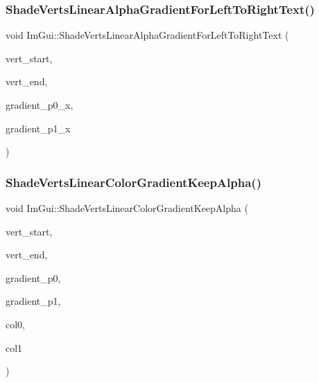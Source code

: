 \mbox{\label{namespace_im_gui_a73b4d230c8fffd2a07d799cd9d4e2a03}} 
\subsubsection{\texorpdfstring{Shade\+Verts\+Linear\+Alpha\+Gradient\+For\+Left\+To\+Right\+Text()}{ShadeVertsLinearAlphaGradientForLeftToRightText()}}
{\footnotesize\ttfamily void Im\+Gui\+::\+Shade\+Verts\+Linear\+Alpha\+Gradient\+For\+Left\+To\+Right\+Text (\begin{DoxyParamCaption}\item[{\mbox{\hyperlink{struct_im_draw_vert}{Im\+Draw\+Vert}} $\ast$}]{vert\+\_\+start,  }\item[{\mbox{\hyperlink{struct_im_draw_vert}{Im\+Draw\+Vert}} $\ast$}]{vert\+\_\+end,  }\item[{float}]{gradient\+\_\+p0\+\_\+x,  }\item[{float}]{gradient\+\_\+p1\+\_\+x }\end{DoxyParamCaption})}

\mbox{\label{namespace_im_gui_a7880876c5072e610be8f8e898d2a8866}} 
\subsubsection{\texorpdfstring{Shade\+Verts\+Linear\+Color\+Gradient\+Keep\+Alpha()}{ShadeVertsLinearColorGradientKeepAlpha()}}
{\footnotesize\ttfamily void Im\+Gui\+::\+Shade\+Verts\+Linear\+Color\+Gradient\+Keep\+Alpha (\begin{DoxyParamCaption}\item[{\mbox{\hyperlink{struct_im_draw_vert}{Im\+Draw\+Vert}} $\ast$}]{vert\+\_\+start,  }\item[{\mbox{\hyperlink{struct_im_draw_vert}{Im\+Draw\+Vert}} $\ast$}]{vert\+\_\+end,  }\item[{\mbox{\hyperlink{struct_im_vec2}{Im\+Vec2}}}]{gradient\+\_\+p0,  }\item[{\mbox{\hyperlink{struct_im_vec2}{Im\+Vec2}}}]{gradient\+\_\+p1,  }\item[{\mbox{\hyperlink{imgui_8h_a118cff4eeb8d00e7d07ce3d6460eed36}{Im\+U32}}}]{col0,  }\item[{\mbox{\hyperlink{imgui_8h_a118cff4eeb8d00e7d07ce3d6460eed36}{Im\+U32}}}]{col1 }\end{DoxyParamCaption})}

